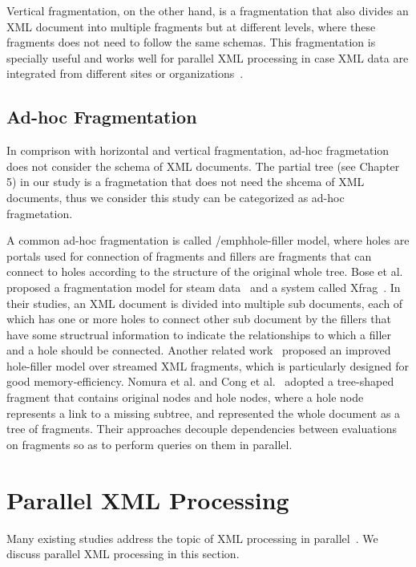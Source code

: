 Vertical fragmentation, on the other hand, is a fragmentation that also divides
an XML document into multiple fragments but at different levels, where these
fragments does not need to follow the same schemas. This fragmentation is
specially useful and works well for parallel XML processing in case XML data are
integrated from different sites or organizations~\cite{CFKL12,KlOD10}.


\subsection{Ad-hoc Fragmentation}

In comprison with horizontal and vertical fragmentation, ad-hoc fragmetation
does not consider the schema of XML documents. The partial tree (see Chapter 5)
in our study is a fragmetation that does not need the shcema of XML documents,
thus we consider this study can be categorized as ad-hoc fragmetation.

A common ad-hoc fragmentation is called /emph{hole-filler} model, where holes
are portals used for connection of fragments and fillers are fragments that can
connect to holes according to the structure of the original whole tree. Bose et
al. proposed a fragmentation model for steam data~\cite{bose2003query} and a
system called Xfrag~\cite{bose2005xfrag}. In their studies, an XML document is
divided into multiple sub documents, each of which has one or more holes  to
connect other sub document by the fillers that have some structrual information
to indicate the relationships to which a filler and a hole should be connected.
Another related work~\cite{lee2012memory}  proposed an improved hole-filler
model over streamed XML fragments, which is particularly designed for good 
memory-efficiency. Nomura et al. \cite{NEMH07} and Cong et al.~\cite{CFKL12}
adopted a tree-shaped fragment that contains original nodes and hole nodes,
where a hole node represents a link to a missing subtree, and represented the
whole document as a tree of fragments. Their approaches decouple dependencies
between evaluations on fragments so as to perform queries on them in parallel.



\section{Parallel XML Processing}
\label{sec:paralleleval}

Many existing studies address the topic of XML processing in
parallel~\cite{BoLS09,PaZC08,LuGa08,Mats09,SAFu05}. We discuss parallel XML
processing in this section.

